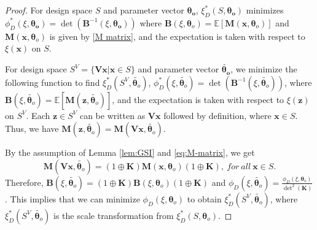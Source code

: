 \documentclass[
]{book}
\theoremstyle{definition}
\theoremstyle{definition}
\theoremstyle{definition}
\theoremstyle{definition}
\theoremstyle{remark}
\begin{document}
\begin{proof}
For design space \(S\) and parameter vector \(\boldsymbol{\theta_o}\), \(\xi_D^*(S,\boldsymbol{\theta_o})\) minimizes \(\phi_D^*(\xi,\boldsymbol{\theta_o})=\det(\boldsymbol{B}^{-1}(\xi,\boldsymbol{\theta_o}))\) where \(\boldsymbol{B}(\xi,\boldsymbol{\theta}_o)=\mathbb{E}[\boldsymbol{M}(\boldsymbol{x},\boldsymbol{\theta}_o)]\) and \(\boldsymbol{M}(\boldsymbol{x},\boldsymbol{\theta}_o)\) is given by \eqref{M matrix}, and the expectation is taken with respect to \(\xi(\boldsymbol{x})\) on \(S\).

For design space \(S^V=\{\boldsymbol{V} \boldsymbol{x}|\boldsymbol{x}\in S\}\) and parameter vector \(\tilde{\boldsymbol{\theta_o}}\), we minimize the following function to find \(\xi_D^*(S^V,\tilde{\boldsymbol{\theta}_o})\), \(\phi_D^*(\xi,\tilde{\boldsymbol{\theta}_o})=\det(\boldsymbol{B}^{-1}(\xi,\tilde{\boldsymbol{\theta}_o}))\), where \(\boldsymbol{B}(\xi,\tilde{\boldsymbol{\theta}_o})=\mathbb{E}[\boldsymbol{M}(\boldsymbol{z},\tilde{\boldsymbol{\theta}_o})]\), and the expectation is taken with respect to \(\xi(\boldsymbol{z})\) on \(S^V\). Each \(\boldsymbol{z}\in S^V\) can be written as \(\boldsymbol{V}\boldsymbol{x}\) followed by definition, where \(\boldsymbol{x}\in S\). Thus, we have \(\boldsymbol{M}(\boldsymbol{z},\tilde{\boldsymbol{\theta}_o})=\boldsymbol{M}(\boldsymbol{V}\boldsymbol{x},\tilde{\boldsymbol{\theta}_o})\).

By the assumption of Lemma \ref{lem:GSI} and \eqref{eq:M-matrix}, we get \[
\boldsymbol{M}(\boldsymbol{V}\boldsymbol{x},\tilde{\boldsymbol{\theta}_o})=(1 \oplus \boldsymbol{K}) \boldsymbol{M}(\boldsymbol{x},\boldsymbol{\theta}_o)(1 \oplus \boldsymbol{K}),~for~all~\boldsymbol{x}\in S.
\]
Therefore, \(\boldsymbol{B}(\xi,\tilde{\boldsymbol{\theta}_o})= (1 \oplus \boldsymbol{K}) \boldsymbol{B}(\xi,\boldsymbol{\theta}_o)(1 \oplus \boldsymbol{K})\) and \(\phi_D(\xi,\tilde{\boldsymbol{\theta}_o})=\frac{\phi_D(\xi,\boldsymbol{\theta}_o)}{\det^2(\boldsymbol{K})}\). This implies that we can minimize \(\phi_D(\xi,\boldsymbol{\theta}_o)\) to obtain \(\xi_D^*(S^V,\tilde{\boldsymbol{\theta}_o})\), where \(\xi_D^*(S^V,\tilde{\boldsymbol{\theta}_o})\) is the scale transformation from \(\xi_D^*(S,\boldsymbol{\theta}_o)\).
\end{proof}
\end{document}
